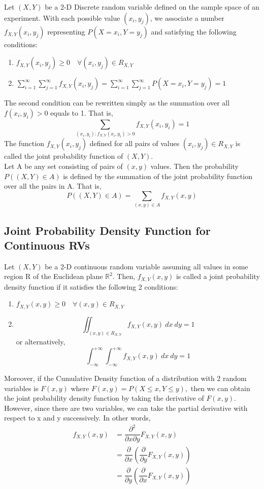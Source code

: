 Let $(X,Y)$ be a 2-D Discrete random variable defined on the sample space of an experiment. With each possible value $(x_i, y_j)$, we associate a number $f_{X,Y}(x_i,y_j)$ representing $P(X = x_i, Y = y_j)$ and satisfying the following conditions:
\begin{enumerate}
    \item $f_{X,Y}(x_i,y_j) \geq 0 \quad \forall (x_i,y_j) \in R_{X,Y}$
    \item $\sum_{i = 1}^{\infty} \sum_{j = 1}^{\infty} f_{X,Y}(x_i, y_j) = \sum_{i = 1}^{\infty} \sum_{j = 1}^{\infty} P(X = x_i, Y = y_j) = 1 $
\end{enumerate}
The second condition can be rewritten simply as the summation over all $f(x_i, y_i) > 0$ equals to 1. That is,
$$
\sum_{(x_i, y_i):f_{X,Y}(x_i,y_i) > 0} f_{X,Y} (x_i,y_i) = 1
$$
The function $f_{X,Y}(x_i,y_j)$  defined for all pairs of values $(x_i, y_j) \in R_{X,Y}$ is called the joint probability function of $(X,Y)$. \\
Let A be any set consisting of pairs of $(x,y)$ values. Then the probability $P((X,Y) \in A)$ is defined by the summation of the joint probability function over all the pairs in A. That is, 
$$
P((X,Y) \in A) = \sum_{(x,y) \in A} f_{X,Y}(x,y)
$$

\subsection{Joint Probability Density Function for Continuous RVs}
Let $(X,Y)$ be a 2-D continuous random variable assuming all values in some region R of the Euclidean plane $\mathbb{R}^2$. Then, $f_{X,Y}(x,y)$ is called a joint probability density function if it satisfies the following 2 conditions:
\begin{enumerate}
    \item $f_{X,Y}(x,y) \geq 0 \quad \forall (x,y) \in R_{X,Y}$
    \item 
    $$
    \iint_{(x,y) \in R_{X,Y}} f_{X,Y}(x,y) \  dx\  dy = 1
    $$ or alternatively, 
    $$
    \int_{-\infty}^{+\infty} \int_{-\infty}^{+\infty} f_{X,Y} (x,y)\  dx\  dy = 1
    $$
\end{enumerate}
Moreover, if the Cumulative Density function of a distribution with 2 random variables is $F(x,y)$ where $F(x,y) = P(X \leq x, Y \leq y),$ then we can obtain the joint probability density function by taking the derivative of $F(x,y)$. However, since there are two variables, we can take the partial derivative with respect to x and y successively. In other words,
\begin{equation*}
\begin{split}
f_{X,Y}(x,y) &= \dfrac{\partial^2}{\partial x \partial y} F_{X,Y}(x,y) \\
&= \dfrac{\partial}{\partial x} \left(\dfrac{\partial}{\partial y} F_{X,Y}(x,y) \right ) \\
&= \dfrac{\partial}{\partial y} \left(\dfrac{\partial}{\partial x} F_{X,Y}(x,y) \right ) 
\end{split}
\end{equation*}


